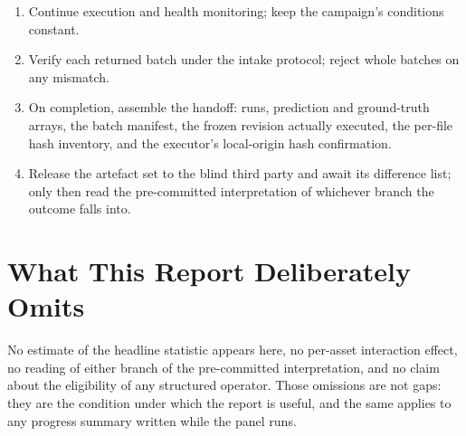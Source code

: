 \documentclass[conference]{IEEEtran}
\begin{document}
\begin{enumerate}
\item Continue execution and health monitoring; keep the campaign's conditions constant.
\item Verify each returned batch under the intake protocol; reject whole batches on any mismatch.
\item On completion, assemble the handoff: runs, prediction and ground-truth arrays, the batch
manifest, the frozen revision actually executed, the per-file hash inventory, and the executor's
local-origin hash confirmation.
\item Release the artefact set to the blind third party and await its difference list; only then read
the pre-committed interpretation of whichever branch the outcome falls into.
\end{enumerate}

\section{What This Report Deliberately Omits}
\label{sec:omit}

No estimate of the headline statistic appears here, no per-asset interaction effect, no reading of
either branch of the pre-committed interpretation, and no claim about the eligibility of any
structured operator. Those omissions are not gaps: they are the condition under which the report is
useful, and the same applies to any progress summary written while the panel runs.
\end{document}
